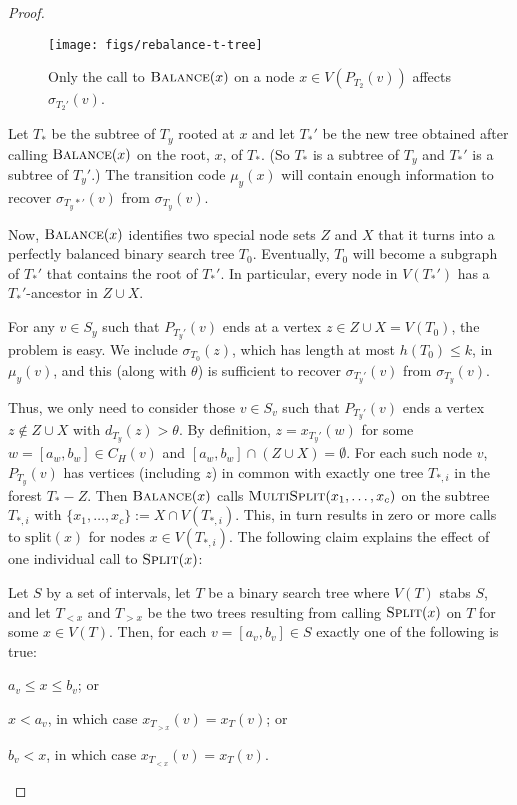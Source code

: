 \documentclass[kpfonts]{patmorin}
\begin{document}
\begin{proof}
  \begin{figure}
    \begin{center}
      \texttt{[image: figs/rebalance-t-tree]}
    \end{center}
    \caption{Only the call to $\textsc{Balance}(x)$ on a node $x\in V(P_{T_2}(v))$ affects $\sigma_{T_2'}(v)$.}
  \end{figure}
  
  Let $T_*$ be the subtree of $T_y$ rooted at $x$ and let $T_*'$ be the new tree obtained after calling $\textsc{Balance}(x)$ on the root, $x$, of $T_*$. (So $T_*$ is a subtree of $T_y$ and $T_*'$ is a subtree of $T_y'$.)
  The transition code $\mu_y(x)$ will contain enough information to recover $\sigma_{T_y*'}(v)$ from $\sigma_{T_y}(v)$. 
  
  Now, $\textsc{Balance}(x)$ identifies two special node sets $Z$ and $X$ that it turns into a perfectly balanced binary search tree $T_0$.  Eventually, $T_0$ will become a subgraph of $T_*'$ that contains the root of $T_*'$.   In particular, every node in $V(T_*')$ has a $T_*'$-ancestor in $Z\cup X$.
  
  For any $v\in S_y$ such that $P_{T_y'}(v)$ ends at a vertex $z\in Z\cup X=V(T_0)$, the problem is easy.  We include $\sigma_{T_0}(z)$, which has length at most $h(T_0)\le k$, in $\mu_y(v)$, and this (along with $\theta$) is sufficient to recover $\sigma_{T_y'}(v)$ from $\sigma_{T_y}(v)$.

  Thus, we only need to consider those $v\in S_v$ such that $P_{T_y'}(v)$ ends a vertex $z\not\in Z\cup X$ with $d_{T_y}(z)>\theta$.  By definition,  $z=x_{T_y'}(w)$ for some $w=[a_w,b_w]\in C_H(v)$ and $[a_w,b_w]\cap (Z\cup X)=\emptyset$.    For each such node $v$, $P_{T_y}(v)$ has vertices (including $z$) in common with exactly one tree $T_{*,i}$ in the forest $T_*-Z$.  Then $\textsc{Balance}(x)$ calls $\textsc{MultiSplit}(x_1,\ldots,x_c)$ on the subtree $T_{*,i}$ with $\{x_1,\ldots,x_c\}:= X\cap V(T_{*,i})$.  This, in turn results in zero or more calls to $\textrm{split}(x)$ for nodes $x\in V(T_{*,i})$. The following claim explains the effect of one individual call to $\textsc{Split}(x)$:
  
  \begin{clm}
    Let $S$ by a set of intervals, let $T$ be a binary search tree where $V(T)$ stabs $S$, and let $T_{<x}$ and $T_{>x}$ be the two trees resulting from calling $\textsc{Split}(x)$ on $T$ for some $x\in V(T)$.  Then, for each $v=[a_v,b_v]\in S$ exactly one of the following is true:
    \begin{compactenum}
      \item $a_v\le x\le b_v$; or
      \item $x< a_v$, in which case $x_{T_{>x}}(v)=x_T(v)$; or
      \item $b_v < x$, in which case $x_{T_{<x}}(v)=x_T(v)$.
    \end{compactenum}
  \end{clm}


\end{proof}
\end{document}
